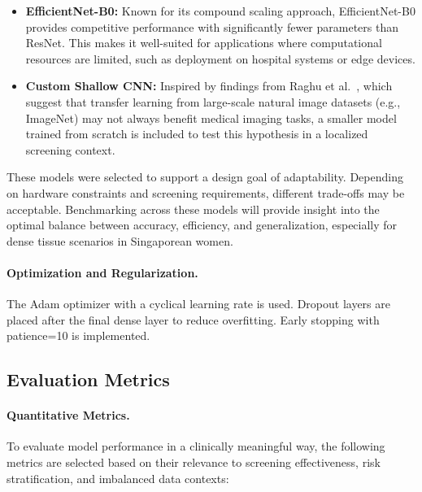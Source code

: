 \documentclass[12pt]{article}
\begin{document}
\begin{itemize}
    \item \textbf{EfficientNet-B0:} Known for its compound scaling approach, EfficientNet-B0 provides competitive performance with significantly fewer parameters than ResNet. This makes it well-suited for applications where computational resources are limited, such as deployment on hospital systems or edge devices.
    
    \item \textbf{Custom Shallow CNN:} Inspired by findings from Raghu et al.~\cite{2}, which suggest that transfer learning from large-scale natural image datasets (e.g., ImageNet) may not always benefit medical imaging tasks, a smaller model trained from scratch is included to test this hypothesis in a localized screening context.
\end{itemize}

These models were selected to support a design goal of adaptability. Depending on hardware constraints and screening requirements, different trade-offs may be acceptable. Benchmarking across these models will provide insight into the optimal balance between accuracy, efficiency, and generalization, especially for dense tissue scenarios in Singaporean women.

\paragraph{Optimization and Regularization.}
The Adam optimizer with a cyclical learning rate is used. Dropout layers are placed after the final dense layer to reduce overfitting. Early stopping with patience=10 is implemented.

\vspace{1em}

\subsection{Evaluation Metrics}

\paragraph{Quantitative Metrics.}
To evaluate model performance in a clinically meaningful way, the following metrics are selected based on their relevance to screening effectiveness, risk stratification, and imbalanced data contexts:
\end{document}
